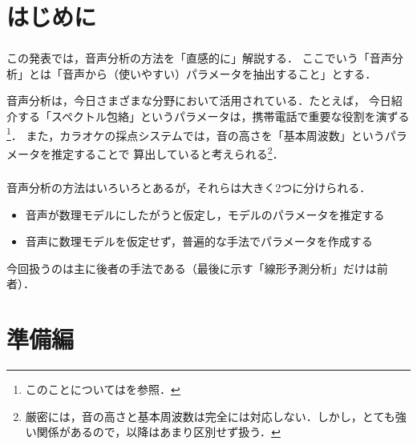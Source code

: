 \documentclass[unicode,11pt]{beamer}
\newcommand{\impact}[1]{\alert{\sffamily #1}}
\begin{document}
\section{はじめに}
\begin{frame}
  \frametitle{\secname}
  この発表では，音声分析の方法を「直感的に」解説する．
  ここでいう「音声分析」とは\impact{「音声から（使いやすい）パラメータを抽出すること」}とする．

  音声分析は，今日さまざまな分野において活用されている．たとえば，
  今日紹介する「スペクトル包絡」というパラメータは，携帯電話で重要な役割を演ずる
  \footnote{このことについては\cite{moriya2016}を参照．}．
  また，カラオケの採点システムでは，音の高さを「基本周波数」というパラメータを推定することで
  算出していると考えられる\footnote{厳密には，音の高さと基本周波数は完全には対応しない\cite{kashino}．しかし，とても強い関係があるので，以降はあまり区別せず扱う．}．
\end{frame}

\begin{frame}
  \frametitle{\secname}
  音声分析の方法はいろいろとあるが，それらは大きく2つに分けられる．
  \begin{itemize}
    \item 音声が数理モデルにしたがうと仮定し，モデルのパラメータを推定する
    \item 音声に数理モデルを仮定せず，普遍的な手法でパラメータを作成する
  \end{itemize}

  今回扱うのは主に後者の手法である（最後に示す「線形予測分析」だけは前者）．
\end{frame}

\section{準備編}
\end{document}
